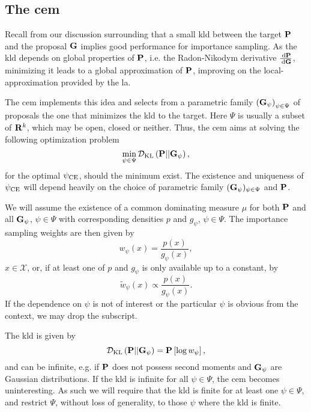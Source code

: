 \subsection{The \texorpdfstring{\Acrfull{cem}}{Cross-Entropy method}}
\label{subsec:cem}
Recall from our discussion surrounding  that a small \acrshort{kld} between the target $\P$ and the proposal $\G$ implies good performance for importance sampling. As the \acrshort{kld} depends on global properties of $\P$, i.e. the Radon-Nikodym derivative $\rnd{\P}{\G}$, minimizing it leads to a global approximation of $\P$, improving on the local-approximation provided by the \acrshort{la}.

The \gls{cem} \citep{Rubinstein1999CrossEntropy,Rubinstein2004CrossEntropy} implements this idea and selects from a parametric family $ \left( \G_{\psi} \right)_{\psi \in \Psi}$ of proposals the one that minimizes the \gls{kld} to the target. Here $\Psi$ is usually a subset of $\R^{k}$, which may be open, closed or neither. Thus, the \acrshort{cem} aims at solving the following optimization problem
$$
    \min_{\psi \in \Psi} \Dkl{\P}{\G_{\psi}},
$$
for the optimal $\pce$, should the minimum exist. The existence and uniqueness of $\pce$ will depend heavily on the choice of parametric family $(\G_{\psi})_{\psi \in \Psi}$ and $\P$. 

We will assume the existence of a common dominating measure $\mu$ for both $\P$ and all $\G_{\psi}$, $\psi \in \Psi$ with corresponding densities $p$ and $g_{\psi}$, $\psi \in \Psi$. The importance sampling weights are then given by 
$$
w_{\psi}(x) = \frac{p(x)}{g_{\psi}(x)},
$$
$x \in \mathcal X$, or, if at least one of $p$ and $g_\psi$ is only available up to a constant, by 
$$
\tilde w_{\psi} (x) \propto \frac{p(x)}{g_{\psi}(x)}.
$$
If the dependence on $\psi$ is not of interest or the particular $\psi$ is obvious from the context, we may drop the subscript. 

The \acrshort{kld} is given by 
$$
    \Dkl{\P}{\G_{\psi}} = \P \left[ \log w_{\psi} \right],
$$
and can be infinite, e.g. if $\P$ does not possess second moments and $\G_{\psi}$ are Gaussian distributions. If the \acrshort{kld} is infinite for all $\psi\in\Psi$, the \acrshort{cem} becomes uninteresting. As such we will require that the \acrshort{kld} is finite for at least one $\psi \in \Psi$, and restrict $\Psi$, without loss of generality, to those $\psi$ where the \acrshort{kld} is finite. 

